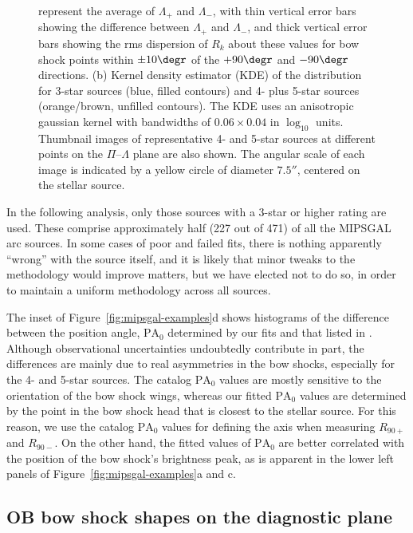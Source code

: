 \begin{figure}
{    represent the average of \(\Lambda_{+}\) and \(\Lambda_{-}\), with thin
    vertical error bars showing the difference between \(\Lambda_{+}\) and
    \(\Lambda_{-}\), and thick vertical error bars showing the rms
    dispersion of \(R_k\) about these values for bow shock points
    within \(\pm 10\degr\) of the \(+90\degr\) and \(-90\degr\)
    directions.  (b) Kernel density estimator (KDE) of the
    distribution for 3-star sources (blue, filled contours) and 4-
    plus 5-star sources (orange/brown, unfilled contours).  The KDE
    uses an anisotropic gaussian kernel with bandwidths of
    \(0.06 \times 0.04\) in \(\log_{10}\) units. Thumbnail images of
    representative 4- and 5-star sources at different points on the
    \(\Pi\)--\(\Lambda\) plane are also shown. The angular scale of each image
    is indicated by a yellow circle of diameter \(7.5''\), centered on
    the stellar source.}
  \label{fig:mipsgal-shapes}
\end{figure}

In the following analysis, only those sources with a 3-star or higher
rating are used.  These comprise approximately half (227 out of 471)
of all the MIPSGAL arc sources.  In some cases of poor and failed
fits, there is nothing apparently ``wrong'' with the source itself,
and it is likely that minor tweaks to the methodology would improve
matters, but we have elected not to do so, in order to maintain a
uniform methodology across all sources.

The inset of Figure~\ref{fig:mipsgal-examples}d shows histograms of
the difference between the position angle, \(\text{PA}_0\) determined
by our fits and that listed in \citet{Kobulnicky:2016a}.  Although
observational uncertainties undoubtedly contribute in part, the
differences are mainly due to real asymmetries in the bow shocks,
especially for the 4- and 5-star sources.  The
\citeauthor{Kobulnicky:2016a} catalog \(\text{PA}_0\) values are
mostly sensitive to the orientation of the bow shock wings, whereas
our fitted \(\text{PA}_0\) values are determined by the point in the
bow shock head that is closest to the stellar source.  For this
reason, we use the catalog \(\text{PA}_0\) values for defining the
axis when measuring \(R_{90+}\) and \(R_{90-}\). On the other hand,
the fitted values of \(\text{PA}_0\) are better correlated with the
position of the bow shock's brightness peak, as is apparent in the
lower left panels of Figure~\ref{fig:mipsgal-examples}a and c.

\subsection{OB bow shock shapes on the diagnostic plane}
\label{sec:ob-shapes}

